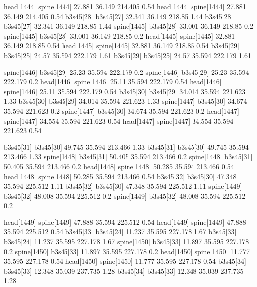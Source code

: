 head[1444]    spine[1444]    27.881    36.149    214.405    0.54
head[1444]    spine[1444]    27.881    36.149    214.405    0.54
b3s45[28]    b3s45[27]    32.341    36.149    218.85    1.44
b3s45[28]    b3s45[27]    32.341    36.149    218.85    1.44
spine[1445]    b3s45[28]    33.001    36.149    218.85    0.2
spine[1445]    b3s45[28]    33.001    36.149    218.85    0.2
head[1445]    spine[1445]    32.881    36.149    218.85    0.54
head[1445]    spine[1445]    32.881    36.149    218.85    0.54
b3s45[29]    b3s45[25]    24.57    35.594    222.179    1.61
b3s45[29]    b3s45[25]    24.57    35.594    222.179    1.61


spine[1446]    b3s45[29]    25.23    35.594    222.179    0.2
spine[1446]    b3s45[29]    25.23    35.594    222.179    0.2
head[1446]    spine[1446]    25.11    35.594    222.179    0.54
head[1446]    spine[1446]    25.11    35.594    222.179    0.54
b3s45[30]    b3s45[29]    34.014    35.594    221.623    1.33
b3s45[30]    b3s45[29]    34.014    35.594    221.623    1.33
spine[1447]    b3s45[30]    34.674    35.594    221.623    0.2
spine[1447]    b3s45[30]    34.674    35.594    221.623    0.2
head[1447]    spine[1447]    34.554    35.594    221.623    0.54
head[1447]    spine[1447]    34.554    35.594    221.623    0.54


b3s45[31]    b3s45[30]    49.745    35.594    213.466    1.33
b3s45[31]    b3s45[30]    49.745    35.594    213.466    1.33
spine[1448]    b3s45[31]    50.405    35.594    213.466    0.2
spine[1448]    b3s45[31]    50.405    35.594    213.466    0.2
head[1448]    spine[1448]    50.285    35.594    213.466    0.54
head[1448]    spine[1448]    50.285    35.594    213.466    0.54
b3s45[32]    b3s45[30]    47.348    35.594    225.512    1.11
b3s45[32]    b3s45[30]    47.348    35.594    225.512    1.11
spine[1449]    b3s45[32]    48.008    35.594    225.512    0.2
spine[1449]    b3s45[32]    48.008    35.594    225.512    0.2


head[1449]    spine[1449]    47.888    35.594    225.512    0.54
head[1449]    spine[1449]    47.888    35.594    225.512    0.54
b3s45[33]    b3s45[24]    11.237    35.595    227.178    1.67
b3s45[33]    b3s45[24]    11.237    35.595    227.178    1.67
spine[1450]    b3s45[33]    11.897    35.595    227.178    0.2
spine[1450]    b3s45[33]    11.897    35.595    227.178    0.2
head[1450]    spine[1450]    11.777    35.595    227.178    0.54
head[1450]    spine[1450]    11.777    35.595    227.178    0.54
b3s45[34]    b3s45[33]    12.348    35.039    237.735    1.28
b3s45[34]    b3s45[33]    12.348    35.039    237.735    1.28



